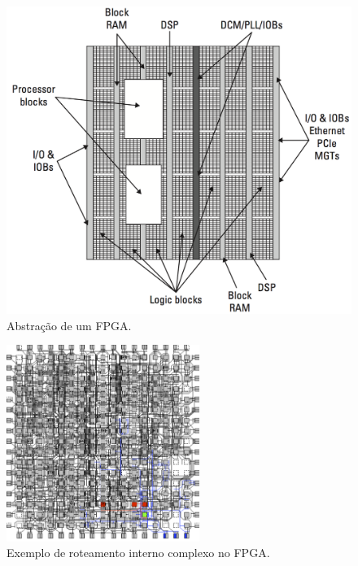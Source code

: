 \documentclass[aspectratio=169]{beamer}
\begin{document}
	\begin{frame}%
		\begin{figure}[h]
			\centering
			\includegraphics[height=1\textheight]{img/fpga/abstracao.png}
			\caption{Abstração de um FPGA.}
			\label{fig:abstracao}
		\end{figure}
	\end{frame}
	
	\begin{frame}%
		\begin{figure}[h]
			\centering
			\includegraphics[width=0.56\textwidth]{img/fpga/exemploFinal.png}
			\caption{Exemplo de roteamento interno complexo no FPGA.}
			\label{fig:exemploFinal}
		\end{figure}
	\end{frame}
	
\end{document}
